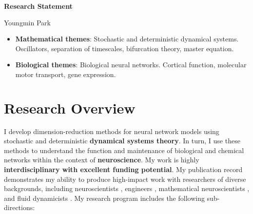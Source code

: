 \documentclass[a4paper,11pt]{article}
\begin{document}
	
	\begin{center}
		\Large \textbf{Research Statement}
		
		\Large Youngmin Park
	\end{center}

    \begin{itemize}
        \item \textbf{Mathematical themes}: Stochastic and deterministic dynamical systems. Oscillators, separation of timescales, bifurcation theory, master equation.
        \item\textbf{Biological themes}: Biological neural networks. Cortical function, molecular motor transport, gene expression.
    \end{itemize}
	
	\section{Research Overview}
	
	I develop dimension-reduction methods for neural network models using stochastic and deterministic \textbf{dynamical systems theory}. In turn, I use these methods to understand the function and maintenance of biological and chemical networks within the context of \textbf{neuroscience}. My work is highly \textbf{interdisciplinary with excellent funding potential}. My publication record demonstrates my ability to produce high-impact work with researchers of diverse backgrounds, including neuroscientists \cite{park2020circuit,shaw2012phase}, engineers \cite{ermentrout2019recent,park2021high}, mathematical neuroscientists \cite{park2016weakly,park2018infinitesimal,park2018multiple,park2018scalar}, and fluid dynamicists \cite{park2020dynamics,park2021coarse,fai2020global}. My research program includes the following sub-directions:
	
\end{document}
